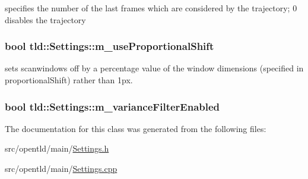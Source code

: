 specifies the number of the last frames which are considered by the trajectory; 0 disables the trajectory 

\hypertarget{classtld_1_1_settings_afd89a9d1a0a8dec5ce524eeed5b0f5e0}{
\subsubsection[{m\_\-useProportionalShift}]{\setlength{\rightskip}{0pt plus 5cm}bool {\bf tld::Settings::m\_\-useProportionalShift}}}
\label{classtld_1_1_settings_afd89a9d1a0a8dec5ce524eeed5b0f5e0}


sets scanwindows off by a percentage value of the window dimensions (specified in proportionalShift) rather than 1px. 

\hypertarget{classtld_1_1_settings_ab3100039fb52ee1a41813812320a6ca3}{
\subsubsection[{m\_\-varianceFilterEnabled}]{\setlength{\rightskip}{0pt plus 5cm}bool {\bf tld::Settings::m\_\-varianceFilterEnabled}}}
\label{classtld_1_1_settings_ab3100039fb52ee1a41813812320a6ca3}


The documentation for this class was generated from the following files:\begin{DoxyCompactItemize}
\item 
src/opentld/main/\hyperlink{_settings_8h}{Settings.h}\item 
src/opentld/main/\hyperlink{_settings_8cpp}{Settings.cpp}\end{DoxyCompactItemize}

